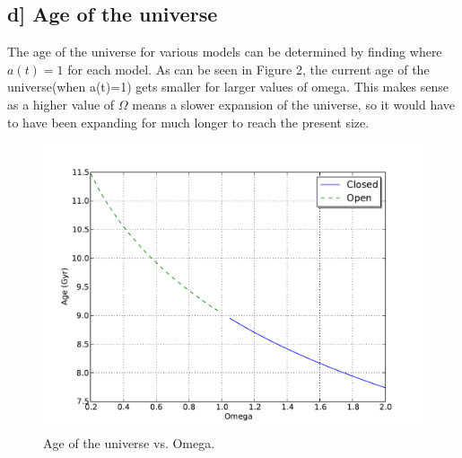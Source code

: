 \documentclass[a4paper,11pt]{article}
\begin{document}
\subsection*{d] Age of the universe}
The age of the universe for various models can be determined by finding where $a(t)=1$ for each model.  As can be seen in Figure 2, the current age of the universe(when a(t)=1) gets smaller for larger values of omega.  This makes sense as a higher value of $\Omega$ means a slower expansion of the universe, so it would have to have been expanding for much longer to reach the present size.  
\begin{figure}[h!]
\begin{center}
\includegraphics[scale=.7]{two_d.pdf}
\caption{Age of the universe vs. Omega.}
\end{center}
\end{figure}



\end{document}
